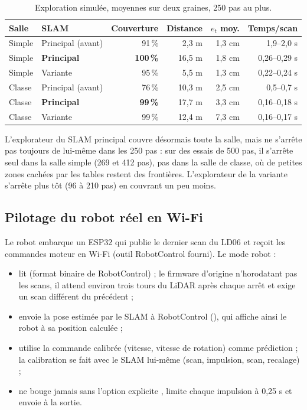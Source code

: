 \documentclass[11pt,a4paper]{article}
\newcommand{\code}[1]{\texttt{\detokenize{#1}}}
\begin{document}
\begin{table}[htbp]
\centering
\caption{Exploration simulée, moyennes sur deux graines, 250 pas au plus.}
\begin{tabular}{llrrrr}
\toprule
Salle & SLAM & Couverture & Distance & $e_t$ moy. & Temps/scan \\
\midrule
Simple & Principal (avant) & 91\,\% & 2,3 m & 1,3 cm & 1,9--2,0 s \\
Simple & \textbf{Principal} & \textbf{100\,\%} & 16,5 m & 1,8 cm & 0,26--0,29 s \\
Simple & Variante & 95\,\% & 5,5 m & 1,3 cm & 0,22--0,24 s \\
\midrule
Classe & Principal (avant) & 76\,\% & 10,3 m & 2,5 cm & 0,5--0,7 s \\
Classe & \textbf{Principal} & \textbf{99\,\%} & 17,7 m & 3,3 cm & 0,16--0,18 s \\
Classe & Variante & 99\,\% & 12,4 m & 7,3 cm & 0,16--0,17 s \\
\bottomrule
\end{tabular}
\end{table}

L'explorateur du SLAM principal couvre désormais toute la salle, mais ne
s'arrête pas toujours de lui-même dans les 250 pas : sur des essais de
500 pas, il s'arrête seul dans la salle simple (269 et 412 pas), pas dans la
salle de classe, où de petites zones cachées par les tables restent des
frontières. L'explorateur de la variante s'arrête plus tôt (96 à 210 pas)
en couvrant un peu moins.

\subsection{Pilotage du robot réel en Wi-Fi}
Le robot embarque un ESP32 qui publie le dernier scan du LD06 et reçoit les
commandes moteur en Wi-Fi (outil RobotControl fourni). Le mode robot :
\begin{itemize}
\item lit \code{/scan} (format binaire de RobotControl) ; le firmware
d'origine n'horodatant pas les scans, il attend environ trois tours du LiDAR
après chaque arrêt et exige un scan différent du précédent ;
\item envoie la pose estimée par le SLAM à RobotControl (\code{/pose}), qui
affiche ainsi le robot à sa position calculée ;
\item utilise la commande calibrée (vitesse, vitesse de rotation) comme
prédiction ; la calibration se fait avec le SLAM lui-même (scan, impulsion,
scan, recalage) ;
\item ne bouge jamais sans l'option explicite \code{--auto}, limite chaque
impulsion à 0,25 s et envoie \code{/stop} à la sortie.
\end{itemize}
\end{document}
